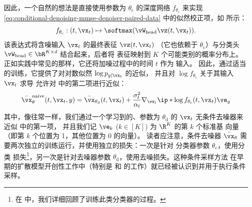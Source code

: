\documentclass[../../book-main_zh.tex]{subfiles}
\begin{document}
因此，一个自然的想法是直接使用参数为 $\theta_{\mathrm{c}}$ 的深度网络 $f_{\theta_{\mathrm{c}}}$ 来实现
\eqref{eq:conditional-denoising-mmse-denoiser-paired-data} 中的似然校正项，如
 所示：
\begin{equation}
    f_{\theta_{\mathrm{c}}} : (t, \vx_t) \mapsto \softmax(\vW_{\mathrm{head}}
    \vz(t, \vx_t)).
\end{equation}
该表达式将含噪输入
$\vx_t$ 的最终表征 $\vz(t, \vx_t)$
（它也依赖于
$\theta_{\mathrm{c}}$）与分类头 $\vW_{\mathrm{head}} \in \bR^{K
\times d}$ 结合起来，后者将
表征映射到 $K$ 个可能类别的概率分布上。
正如实践中常见的那样，它还将加噪过程中的时间 $t$ 作为
输入。
因此，通过适当的训练，它提供了对对数似然 $\log p_{y \mid \vx_t}$ 的近似，
并且对 $\log f_{\theta_{\mathrm{c}}}$ 关于其输入 $\vx_t$ 求导
允许对  中的第二项进行近似：
\begin{equation}\label{eq:conditional-denoising-mmse-denoiser-paired-data-approx}
    \bar{\vx}_{\theta}^{\mathrm{naive}}(t, \vx_t, y)
    =
    \bar{\vx}_{\theta_{\mathrm{d}}}(t, \vx_t)
    + \frac{\sigma_t^2}{\alpha_t}
    \nabla_{\vx_t}
    \ip*{
        \log f_{\theta_{\mathrm{c}}}(t, \vx_t)
    }{
        \ve_{y}
    }
\end{equation}
其中，像往常一样，我们通过一个学习到的、参数为 $\theta_{\mathrm{d}}$ 的 $\vx_t$ 无条件去噪器来近似
 中的第一项，
并且我们记 $\ve_k$ ($k \in [K]$) 为 $\R^K$ 的第 $k$ 个标准基
向量（即第 $k$ 个位置为 1，其他位置为 0 的向量）。
读者应注意，条件去噪器 $\bar{\vx}_{\theta}$
需要两次独立的训练运行，并使用独立的损失：一次是针对
分类器参数 $\theta_{\mathrm{c}}$，使用分类
损失\footnote{在  中，我们详细回顾了训练此类分类器的过程。}，另一次是针对去噪器参数
$\theta_{\mathrm{d}}$，使用去噪损失。这种条件采样方法
在早期的扩散模型开创性工作中（特别是
\citet{Sohl-Dickstein2015} 和 \citet{song2020score} 的工作）就已经被认识到并用于执行条件采样。
\end{document}
